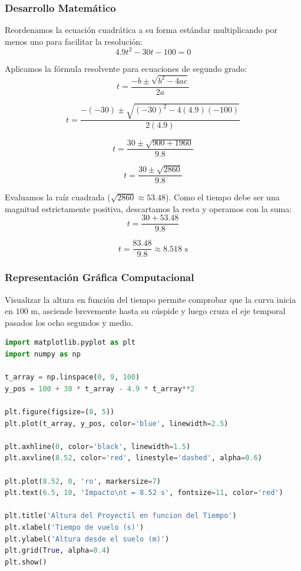 \documentclass[12pt, a4paper]{article}
\begin{document}
\subsubsection*{Desarrollo Matemático}

Reordenamos la ecuación cuadrática a su forma estándar multiplicando por menos uno para facilitar la resolución:
\begin{equation}
4.9t^2 - 30t - 100 = 0
\end{equation}

Aplicamos la fórmula resolvente para ecuaciones de segundo grado:
\begin{equation}
t = \frac{-b \pm \sqrt{b^2 - 4ac}}{2a}
\end{equation}

\begin{equation}
t = \frac{-(-30) \pm \sqrt{(-30)^2 - 4(4.9)(-100)}}{2(4.9)}
\end{equation}

\begin{equation}
t = \frac{30 \pm \sqrt{900 + 1960}}{9.8}
\end{equation}

\begin{equation}
t = \frac{30 \pm \sqrt{2860}}{9.8}
\end{equation}

Evaluamos la raíz cuadrada ($\sqrt{2860} \approx 53.48$). Como el tiempo debe ser una magnitud estrictamente positiva, descartamos la resta y operamos con la suma:
\begin{equation}
t = \frac{30 + 53.48}{9.8}
\end{equation}

\begin{equation}
t = \frac{83.48}{9.8} \approx 8.518 \text{ s}
\end{equation}

\subsubsection*{Representación Gráfica Computacional}

Visualizar la altura en función del tiempo permite comprobar que la curva inicia en $100 \text{ m}$, asciende brevemente hasta su cúspide y luego cruza el eje temporal pasados los ocho segundos y medio.

\begin{lstlisting}[language=Python]
import matplotlib.pyplot as plt
import numpy as np

t_array = np.linspace(0, 9, 100)
y_pos = 100 + 30 * t_array - 4.9 * t_array**2

plt.figure(figsize=(8, 5))
plt.plot(t_array, y_pos, color='blue', linewidth=2.5)

plt.axhline(0, color='black', linewidth=1.5)
plt.axvline(8.52, color='red', linestyle='dashed', alpha=0.6)

plt.plot(8.52, 0, 'ro', markersize=7)
plt.text(6.5, 10, 'Impacto\nt = 8.52 s', fontsize=11, color='red')

plt.title('Altura del Proyectil en funcion del Tiempo')
plt.xlabel('Tiempo de vuelo (s)')
plt.ylabel('Altura desde el suelo (m)')
plt.grid(True, alpha=0.4)
plt.show()
\end{lstlisting}
\end{document}
